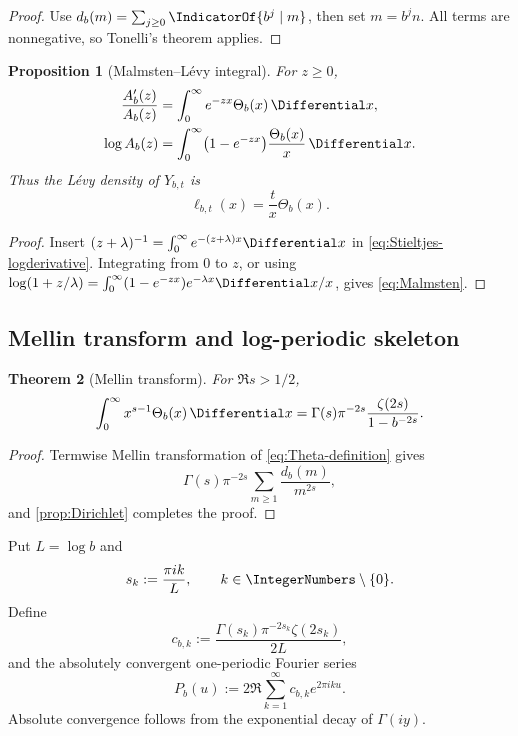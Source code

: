 \documentclass[11pt]{article}
\newtheorem{theorem}{Theorem}[section]
\newtheorem{proposition}[theorem]{Proposition}
\theoremstyle{definition}
\theoremstyle{remark}
\begin{document}
\begin{proof}
Use
\(d_b(m)=\sum_{j\ge0}\IndicatorOf{b^j\mid m}\), then set \(m=b^jn\).  All terms
are nonnegative, so Tonelli's theorem applies.
\end{proof}

\begin{proposition}[Malmsten--L\'evy integral]\label{prop:Malmsten}
For \(z\ge0\),
\begin{align}
  \frac{A_b'(z)}{A_b(z)}
  &=\int_0^{\infty}e^{-zx}\Theta_b(x)\,\Differential x,
  \label{eq:logderivative-heat}\\
  \log A_b(z)
  &=\int_0^{\infty}\bigl(1-e^{-zx}\bigr)
    \frac{\Theta_b(x)}{x}\,\Differential x.
  \label{eq:Malmsten}
\end{align}
Thus the L\'evy density of \(Y_{b,t}\) is
\begin{equation}\label{eq:Levy-density}
  \ell_{b,t}(x)=\frac{t}{x}\Theta_b(x).
\end{equation}
\end{proposition}

\begin{proof}
Insert
\(
(z+\lambda)^{-1}=\int_0^\infty e^{-(z+\lambda)x}\Differential x
\)
in \eqref{eq:Stieltjes-logderivative}.  Integrating from \(0\) to \(z\), or using
\(
\log(1+z/\lambda)=\int_0^\infty(1-e^{-zx})e^{-\lambda x}\Differential x/x
\), gives \eqref{eq:Malmsten}.
\end{proof}

\subsection{Mellin transform and log-periodic skeleton}

\begin{theorem}[Mellin transform]\label{thm:Mellin-Theta}
For \(\Re s>1/2\),
\begin{equation}\label{eq:Mellin-Theta}
  \int_0^{\infty}x^{s-1}\Theta_b(x)\,\Differential x
  =\Gamma(s)\pi^{-2s}\frac{\zeta(2s)}{1-b^{-2s}}.
\end{equation}
\end{theorem}

\begin{proof}
Termwise Mellin transformation of \eqref{eq:Theta-definition} gives
\[
 \Gamma(s)\pi^{-2s}\sum_{m\ge1}\frac{d_b(m)}{m^{2s}},
\]
and \cref{prop:Dirichlet} completes the proof.
\end{proof}

Put \(L=\log b\) and
\begin{equation}\label{eq:sk}
  s_k:=\frac{\pi ik}{L},\qquad k\in\IntegerNumbers\setminus\{0\}.
\end{equation}
Define
\begin{equation}\label{eq:ck}
  c_{b,k}:=
  \frac{\Gamma(s_k)\pi^{-2s_k}\zeta(2s_k)}{2L},
\end{equation}
and the absolutely convergent one-periodic Fourier series
\begin{equation}\label{eq:P-b}
  P_b(u):=2\Re\sum_{k=1}^{\infty}c_{b,k}e^{2\pi iku}.
\end{equation}
Absolute convergence follows from the exponential decay of \(\Gamma(i y)\).
\end{document}
